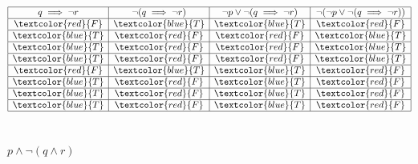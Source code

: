 \documentclass[12pt, letterpaper]{article}
\begin{document}
\begin{displaymath}
    \begin{array}{|c|c|c|c|}
    \hline
    q \implies \neg r & \neg(q \implies \neg r) & \neg p \lor \neg(q \implies \neg r) & \neg(\neg p \lor \neg(q \implies \neg r))\\ %
    \hline %
    \textcolor{red}{F} & \textcolor{blue}{T} & \textcolor{blue}{T} & \textcolor{red}{F}\\
    \hline
    \textcolor{blue}{T} & \textcolor{red}{F} & \textcolor{red}{F} & \textcolor{blue}{T}\\
    \hline
    \textcolor{blue}{T} & \textcolor{red}{F} & \textcolor{red}{F} & \textcolor{blue}{T}\\
    \hline
    \textcolor{blue}{T} & \textcolor{red}{F} & \textcolor{red}{F} & \textcolor{blue}{T}\\
    \hline
    \textcolor{red}{F} & \textcolor{blue}{T} & \textcolor{blue}{T} & \textcolor{red}{F}\\
    \hline
    \textcolor{blue}{T} & \textcolor{red}{F} & \textcolor{blue}{T} & \textcolor{red}{F}\\
    \hline
    \textcolor{blue}{T} & \textcolor{red}{F} & \textcolor{blue}{T} & \textcolor{red}{F}\\
    \hline
    \textcolor{blue}{T} & \textcolor{red}{F} & \textcolor{blue}{T} & \textcolor{red}{F}\\
    \hline
    \end{array}
\end{displaymath} \\[1in]

{\large\centerline{$p \land \neg(q \land r)$}}
\end{document}
